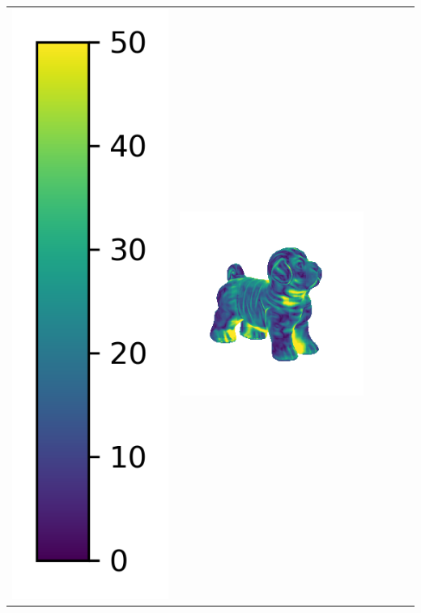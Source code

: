 \begin{tabularx}{\linewidth}{@{}Y@{}Y@{}Y@{}Y@{}Y@{}Y@{}}
\includegraphics[width=0.2\linewidth]{semisynthetic/colorbar_error_vertical.png} &
\includegraphics[width=\linewidth]{semisynthetic/20160617_17_ours_err.png} &

\end{tabularx}
